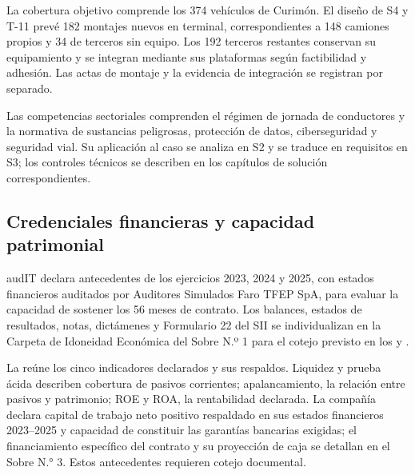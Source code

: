 La cobertura objetivo comprende los 374 vehículos de Curimón. El diseño de S4 y T-11 prevé 182 montajes nuevos en terminal, correspondientes a 148 camiones propios y 34 de terceros sin equipo. Los 192 terceros restantes conservan su equipamiento y se integran mediante sus plataformas según factibilidad y adhesión. Las actas de montaje y la evidencia de integración se registran por separado.


Las competencias sectoriales comprenden el régimen de jornada de conductores y la normativa de sustancias peligrosas, protección de datos, ciberseguridad y seguridad vial. Su aplicación al caso se analiza en S2 y se traduce en requisitos en S3; los controles técnicos se describen en los capítulos de solución correspondientes.

\subsection{Credenciales financieras y capacidad patrimonial}\label{sec:1-financiero}

audIT declara antecedentes de los ejercicios 2023, 2024 y 2025, con estados financieros auditados por Auditores Simulados Faro TFEP SpA, para evaluar la capacidad de sostener los 56 meses de contrato. Los balances, estados de resultados, notas, dictámenes y Formulario 22 del SII se individualizan en la Carpeta de Idoneidad Económica del Sobre N.º 1 para el cotejo previsto en los  y .

La  reúne los cinco indicadores declarados y sus respaldos. Liquidez y prueba ácida describen cobertura de pasivos corrientes; apalancamiento, la relación entre pasivos y patrimonio; ROE y ROA, la rentabilidad declarada. La compañía declara capital de trabajo neto positivo respaldado en sus estados financieros 2023--2025 y capacidad de constituir las garantías bancarias exigidas; el financiamiento específico del contrato y su proyección de caja se detallan en el Sobre N.° 3. Estos antecedentes requieren cotejo documental.


